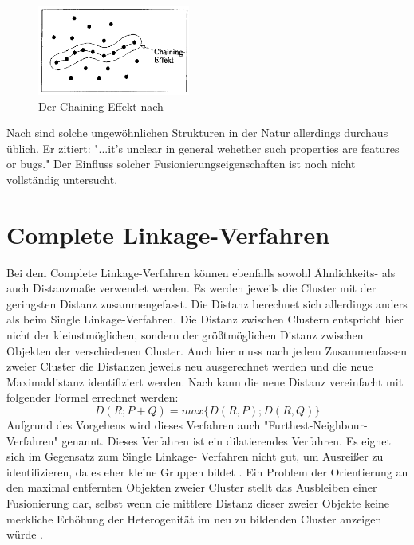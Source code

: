 \begin{figure}[h]
	\begin{center}
		\includegraphics[width=5cm]{pics/klemm19.png}
	\end{center}
	\caption{Der Chaining-Effekt nach \citet[S. 19]{Klemm.1995}}
	\label{pic:klemm19}
\end{figure}

Nach \citet[S. 416]{Clarke.2009} sind solche ungewöhnlichen Strukturen in der Natur allerdings durchaus üblich. Er zitiert: "...it's unclear in general wehether such properties are features or bugs." Der Einfluss solcher Fusionierungseigenschaften ist noch nicht vollständig untersucht.

\section{Complete Linkage-Verfahren}
Bei dem Complete Linkage-Verfahren können ebenfalls sowohl Ähnlichkeits- als auch Distanzmaße verwendet werden. Es werden jeweils die Cluster mit der geringsten Distanz zusammengefasst. Die Distanz berechnet sich allerdings anders als beim Single Linkage-Verfahren. Die Distanz zwischen Clustern entspricht hier nicht der kleinstmöglichen, sondern der größtmöglichen Distanz zwischen Objekten der verschiedenen Cluster. Auch hier muss nach jedem Zusammenfassen zweier Cluster die Distanzen jeweils neu ausgerechnet werden und die neue Maximaldistanz identifiziert werden.
Nach \citet[S.483]{Backhaus.2016} kann die neue Distanz vereinfacht mit folgender Formel errechnet werden:                                                                                                                                                                                                                                                                                                                                                               
\begin{equation}
	D(R;P+Q) = max\{D(R,P);D(R,Q)\}
\end{equation}
Aufgrund des Vorgehens wird dieses Verfahren auch "Furthest-Neighbour-Verfahren" genannt.
Dieses Verfahren ist ein dilatierendes Verfahren. Es eignet sich im Gegensatz zum Single Linkage- Verfahren nicht gut, um Ausreißer zu identifizieren, da es eher kleine Gruppen bildet \citep[Vgl.][S. 483/484]{Backhaus.2016}. Ein Problem der Orientierung an den maximal entfernten Objekten zweier Cluster stellt das Ausbleiben einer Fusionierung dar, selbst wenn die mittlere Distanz dieser zweier Objekte keine merkliche Erhöhung der Heterogenität im neu zu bildenden Cluster anzeigen würde \citep[Vgl.][S. 236]{Eckey.2002}.

